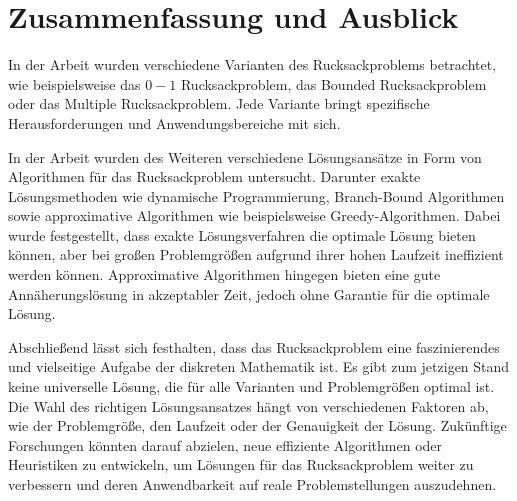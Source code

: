 \chapter{Zusammenfassung und Ausblick}
\noindent In der Arbeit wurden verschiedene Varianten des Rucksackproblems betrachtet,
wie beispielsweise das $0-1$ Rucksackproblem, das Bounded Rucksackproblem oder das Multiple Rucksackproblem. 
Jede Variante bringt spezifische Herausforderungen und Anwendungsbereiche mit sich.

In der Arbeit wurden des Weiteren verschiedene Lösungsansätze
in Form von Algorithmen für das Rucksackproblem untersucht.
Darunter exakte Lösungsmethoden wie dynamische Programmierung, Branch-Bound Algorithmen 
sowie approximative Algorithmen wie beispielsweise Greedy-Algorithmen. 
Dabei wurde festgestellt, dass exakte Lösungsverfahren die optimale Lösung bieten können, 
aber bei großen Problemgrößen aufgrund ihrer hohen Laufzeit ineffizient werden können. 
Approximative Algorithmen hingegen bieten eine gute Annäherungslösung in akzeptabler Zeit, 
jedoch ohne Garantie für die optimale Lösung.

Abschließend lässt sich festhalten, dass das Rucksackproblem eine faszinierendes und vielseitige Aufgabe der diskreten Mathematik ist.
Es gibt zum jetzigen Stand keine universelle Lösung, die für alle Varianten und Problemgrößen optimal ist. 
Die Wahl des richtigen Lösungsansatzes hängt von verschiedenen Faktoren ab, wie der Problemgröße, den Laufzeit oder der Genauigkeit der Lösung. 
Zukünftige Forschungen könnten darauf abzielen, neue effiziente Algorithmen oder Heuristiken zu entwickeln,
um Lösungen für das Rucksackproblem weiter zu verbessern und deren Anwendbarkeit auf reale Problemstellungen auszudehnen.